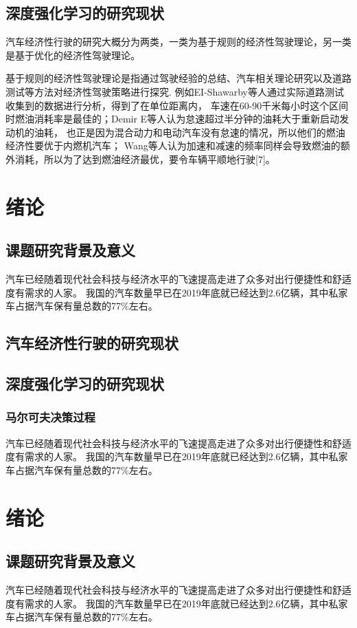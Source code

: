 \section{深度强化学习的研究现状}
\par  汽车经济性行驶的研究大概分为两类，一类为基于规则的经济性驾驶理论，另一类是基于优化的经济性驾驶理论。
\par  基于规则的经济性驾驶理论是指通过驾驶经验的总结、汽车相关理论研究以及道路测试等方法对经济性驾驶策略进行探究.
例如EI-Shawarby等人通过实际道路测试收集到的数据进行分析，得到了在单位距离内，
车速在60-90千米每小时这个区间时燃油消耗率是最佳的；Demir E等人认为怠速超过半分钟的油耗大于重新启动发动机的油耗，
也正是因为混合动力和电动汽车没有怠速的情况，所以他们的燃油经济性要优于内燃机汽车；
Wang等人认为加速和减速的频率同样会导致燃油的额外消耗，所以为了达到燃油经济最优，要令车辆平顺地行驶[7]。

\chapter{绪论}
\section{课题研究背景及意义}
汽车已经随着现代社会科技与经济水平的飞速提高走进了众多对出行便捷性和舒适度有需求的人家。
我国的汽车数量早已在2019年底就已经达到2.6亿辆，其中私家车占据汽车保有量总数的77\%左右。
\section{汽车经济性行驶的研究现状}
\section{深度强化学习的研究现状}
\subsection{马尔可夫决策过程}
汽车已经随着现代社会科技与经济水平的飞速提高走进了众多对出行便捷性和舒适度有需求的人家。
我国的汽车数量早已在2019年底就已经达到2.6亿辆，其中私家车占据汽车保有量总数的77\%左右。




\chapter{绪论}
\section{课题研究背景及意义}
汽车已经随着现代社会科技与经济水平的飞速提高走进了众多对出行便捷性和舒适度有需求的人家。
我国的汽车数量早已在2019年底就已经达到2.6亿辆，其中私家车占据汽车保有量总数的77\%左右。
